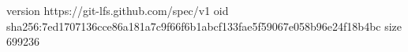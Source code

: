 version https://git-lfs.github.com/spec/v1
oid sha256:7ed1707136cce86a181a7c9f66f6b1abcf133fae5f59067e058b96e24f18b4bc
size 699236
